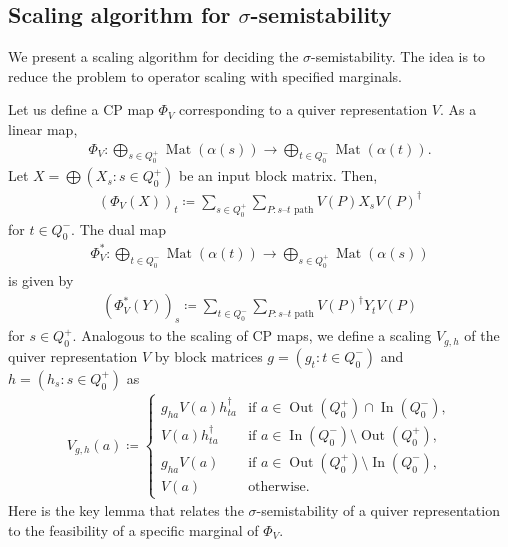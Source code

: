 \documentclass[a4paper,11pt]{article}
\numberwithin{equation}{section}
\DeclareMathOperator{\Mat}{Mat}
\DeclareMathOperator{\In}{In}
\DeclareMathOperator{\Out}{Out}
\begin{document}
\subsection{Scaling algorithm for $\sigma$-semistability}
We present a scaling algorithm for deciding the $\sigma$-semistability.
The idea is to reduce the problem to operator scaling with specified marginals. 

Let us define a CP map $\Phi_V$ corresponding to a quiver representation $V$.
As a linear map,
\begin{align}
    \Phi_V : \bigoplus_{s \in Q_0^+} \Mat(\alpha(s)) \to \bigoplus_{t \in Q_0^-} \Mat(\alpha(t)).
\end{align}
Let $X = \bigoplus (X_s : s \in Q_0^+)$ be an input block matrix.
Then,
\begin{align}
    (\Phi_V(X))_t \coloneqq  \sum_{s \in Q_0^+}\sum_{P: \text{$s$--$t$ path}} V(P) X_{s} V(P)^\dagger
\end{align}
for $t \in Q_0^-$.
The dual map 
\begin{align}
    \Phi_V^*: \bigoplus_{t \in Q_0^-} \Mat(\alpha(t)) \to \bigoplus_{s \in Q_0^+} \Mat(\alpha(s))
\end{align}
is given by
\begin{align}
    (\Phi_V^*(Y))_s \coloneqq  \sum_{t \in Q_0^-}\sum_{P: \text{$s$--$t$ path}} V(P)^\dagger Y_{t} V(P)
\end{align}
for $s \in Q_0^+$.
Analogous to the scaling of CP maps, we define a scaling $V_{g,h}$ of the quiver representation $V$ by block matrices $g = (g_t : t \in Q_0^-)$ and $h = (h_s : s \in Q_0^+)$ as
\begin{align}
    V_{g,h}(a) \coloneqq 
    \begin{cases}
        g_{ha} V(a) h_{ta}^{\dagger}  & \text{if $a \in \Out(Q_0^+) \cap \In(Q_0^-)$}, \\
        V(a) h_{ta}^{\dagger} & \text{if $a \in \In(Q_0^-) \setminus \Out(Q_0^+)$}, \\
        g_{ha} V(a)  & \text{if $a \in \Out(Q_0^+) \setminus \In(Q_0^-)$}, \\
        V(a) & \text{otherwise}.
    \end{cases}
\end{align}
Here is the key lemma that relates the $\sigma$-semistability of a quiver representation to the feasibility of a specific marginal of $\Phi_V$.
\end{document}
